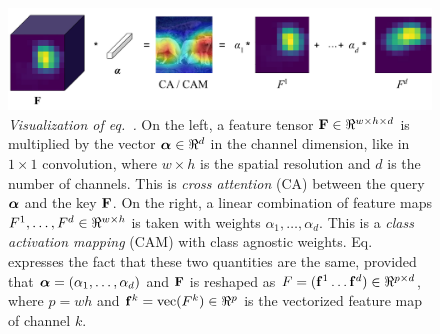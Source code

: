 \begin{figure}[t]
    \centering
    \includegraphics[width=.7\textwidth]{fig/castream/images/CA-CAM.pdf}
    \vspace{3pt}
    \caption{\emph{Visualization of eq.~.} On the left, a feature tensor $\vF \in 
    \real^{w \times h \times d}$ is multiplied by the vector $\valpha \in \real^d$ in the channel 
    dimension, like in $1 \times 1$ convolution, where $w \times h$ is the spatial resolution and 
    $d$ is the number of channels. This is \emph{cross attention} (CA) 
    \autocite{dosovitskiy2020image} between the query ${\boldsymbol{\alpha}}$ and the key $\mathbf{F}$. On the right, a 
    linear combination of feature maps $F^1, \dots, F^d \in \real^{w \times h}$ is taken with 
    weights $\alpha_1, \dots, \alpha_d$. This is a \emph{class activation mapping} (CAM) 
    \autocite{zhou2016learning} with class agnostic weights. Eq.~ expresses the fact 
    that these two quantities are the same, provided that ${\boldsymbol{\alpha}} = (\alpha_1, \dots, \alpha_d)$ 
    and $\mathbf{F}$ is reshaped as $F = (\vf^1 \dots \vf^d) \in \real^{p \times d}$, where $p = wh$ and 
    $\vf^k = \vect(F^k) \in \real^{p}$ is the vectorized feature map of channel $k$.}
    \label{fig:connection}
\end{figure}